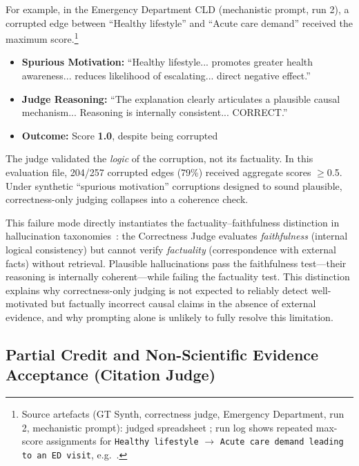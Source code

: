 For example, in the Emergency Department CLD (mechanistic prompt, run 2), a corrupted edge between ``Healthy lifestyle'' and ``Acute care demand'' received the maximum score.\footnote{Source artefacts (GT Synth, correctness judge, Emergency Department, run 2, mechanistic prompt): judged spreadsheet ; run log shows repeated max-score assignments for \texttt{Healthy lifestyle} $\rightarrow$ \texttt{Acute care demand leading to an ED visit}, e.g.\ .}%
\begin{itemize}[noitemsep]
    \item \textbf{Spurious Motivation:} ``Healthy lifestyle... promotes greater health awareness... reduces likelihood of escalating... direct negative effect.''
    \item \textbf{Judge Reasoning:} ``The explanation clearly articulates a plausible causal mechanism... Reasoning is internally consistent... CORRECT.''
    \item \textbf{Outcome:} Score \textbf{1.0}, despite being corrupted
\end{itemize}

The judge validated the \textit{logic} of the corruption, not its factuality. In this evaluation file, 204/257 corrupted edges (79\%) received aggregate scores $\geq$0.5. Under synthetic ``spurious motivation'' corruptions designed to sound plausible, correctness-only judging collapses into a coherence check.

This failure mode directly instantiates the factuality--faithfulness distinction in hallucination taxonomies~\citep{huang2025hallucination}: the Correctness Judge evaluates \emph{faithfulness} (internal logical consistency) but cannot verify \emph{factuality} (correspondence with external facts) without retrieval. Plausible hallucinations pass the faithfulness test---their reasoning is internally coherent---while failing the factuality test. This distinction explains why correctness-only judging is not expected to reliably detect well-motivated but factually incorrect causal claims in the absence of external evidence, and why prompting alone is unlikely to fully resolve this limitation.

\subsection{Partial Credit and Non-Scientific Evidence Acceptance (Citation Judge)}

